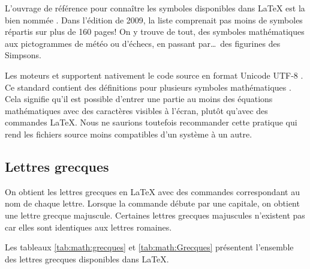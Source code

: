 L'ouvrage de référence pour connaître les symboles disponibles dans
{\LaTeX} est la bien nommée %
. %
Dans l'édition de 2009, la liste comprenait pas moins de 
symboles répartis sur plus de 160 pages! On y trouve de tout, des
symboles mathématiques aux pictogrammes de météo ou d'échecs, en
passant par\dots\ des figurines des Simpsons.

\begin{important}
  Les moteurs {\XeTeX} et {\LuaTeX} supportent nativement le code
  source en format Unicode UTF-8 \citep{Unicode:5.0}. Ce standard
  contient des définitions pour plusieurs symboles mathématiques
  \citep{wikipedia:unicode-math}. Cela signifie qu'il est possible
  d'entrer une partie au moins des équations mathématiques avec des
  caractères visibles à l'écran, plutôt qu'avec des commandes
  {\LaTeX}. Nous ne saurions toutefois recommander cette pratique qui
  rend les fichiers source moins compatibles d'un système à un autre.
\end{important}

\subsection{Lettres grecques}
\label{sec:math:symboles:grecques}

On obtient les lettres grecques en {\LaTeX} avec des commandes
correspondant au nom de chaque lettre. Lorsque la commande débute par
une capitale, on obtient une lettre grecque majuscule. Certaines
lettres grecques majuscules n'existent pas car elles sont identiques
aux lettres romaines.

Les tableaux \ref{tab:math:grecques} et \ref{tab:math:Grecques}
présentent l'ensemble des lettres grecques disponibles dans {\LaTeX}.

